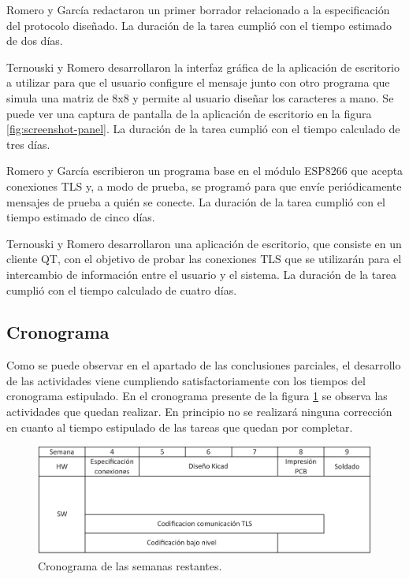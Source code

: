 Romero y García redactaron un primer borrador relacionado a la especificación del protocolo diseñado. La duración de la tarea cumplió con el tiempo estimado de dos días.

Ternouski y Romero desarrollaron la interfaz gráfica de la aplicación de escritorio a utilizar para que el usuario configure el mensaje junto con otro programa que simula una matriz de 8x8 y permite al usuario diseñar los caracteres a mano. Se puede ver una captura de pantalla de la aplicación de escritorio en la figura \ref{fig:screenshot-panel}. La duración de la tarea cumplió con el tiempo calculado de tres días.

Romero y García escribieron un programa base en el módulo ESP8266 que acepta conexiones TLS y, a modo de prueba, se programó para que envíe periódicamente mensajes de prueba a quién se conecte. La duración de la tarea cumplió con el tiempo estimado de cinco días.

Ternouski y Romero desarrollaron una aplicación de escritorio, que consiste en un cliente QT, con el objetivo de probar las conexiones TLS que se utilizarán para el intercambio de información entre el usuario y el sistema. La duración de la tarea cumplió con el tiempo calculado de cuatro días.

\subsection{Cronograma}
Como se puede observar en el apartado de las conclusiones parciales, el desarrollo de las actividades viene cumpliendo satisfactoriamente con los tiempos del cronograma estipulado. En el cronograma presente de la figura \ref{fig:cronograma} se observa las actividades que quedan realizar. En principio no se realizará ninguna corrección en cuanto al tiempo estipulado de las tareas que quedan por completar.

\begin{figure}[h!]
    \centering
    \includegraphics[width=\linewidth]{imagenes/cronograma.pdf}
    \caption{Cronograma de las semanas restantes.}
    \label{fig:cronograma}
\end{figure}

